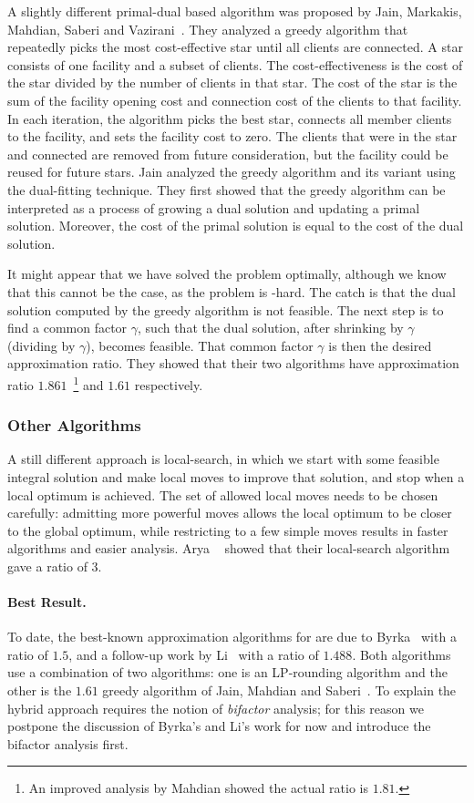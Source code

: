 \documentclass[oneside,final]{ucr}
\begin{document}
A slightly different primal-dual based algorithm was
proposed by Jain, Markakis, Mahdian, Saberi and
Vazirani~\cite{JainMMSV03}. They analyzed a greedy algorithm
that repeatedly picks the most cost-effective star until all
clients are connected. A star consists of one facility and a
subset of clients. The cost-effectiveness is the cost of the
star divided by the number of clients in that star. The cost
of the star is the sum of the facility opening cost and
connection cost of the clients to that facility. In each
iteration, the algorithm picks the best star, connects all
member clients to the facility, and sets the facility cost
to zero. The clients that were in the star and connected are
removed from future consideration, but the facility could be
reused for future stars. Jain {\etal} analyzed the greedy
algorithm and its variant using the dual-fitting
technique. They first showed that the greedy algorithm can
be interpreted as a process of growing a dual solution and
updating a primal solution. Moreover, the cost of the primal
solution is equal to the cost of the dual solution.

It might appear that we have solved the {\UFL} problem
optimally, although we know that this cannot be the case, as
the {\UFL} problem is {\NP}-hard. The catch is that the dual
solution computed by the greedy algorithm is not
feasible. The next step is to find a common factor $\gamma$,
such that the dual solution, after shrinking by $\gamma$
(dividing by $\gamma$), becomes feasible. That common factor
$\gamma$ is then the desired approximation ratio. They
showed that their two algorithms have approximation ratio
$1.861$~\footnote{An improved analysis by Mahdian showed the
  actual ratio is $1.81$.}  and $1.61$ respectively.

\subsubsection{Other Algorithms}
A still different approach is local-search, in which we
start with some feasible integral solution and make local
moves to improve that solution, and stop when a local
optimum is achieved. The set of allowed local moves needs to
be chosen carefully: admitting more powerful moves allows
the local optimum to be closer to the global optimum, while
restricting to a few simple moves results in faster
algorithms and easier analysis. Arya
{\etal}~\cite{AryaGKMMP01} showed that their local-search
algorithm gave a ratio of $3$.

\paragraph{Best Result.} To date, the best-known
approximation algorithms for {\UFL} are due to
Byrka~\cite{Byrka07} with a ratio of $1.5$, and a follow-up
work by Li~\cite{Li11} with a ratio of $1.488$. Both
algorithms use a combination of two algorithms: one is an
LP-rounding algorithm and the other is the $1.61$ greedy
algorithm of Jain, Mahdian and Saberi~\cite{JainMS02}. To
explain the hybrid approach requires the notion of
\emph{bifactor} analysis; for this reason we postpone the
discussion of Byrka's and Li's work for now and introduce
the bifactor analysis first.
\end{document}
